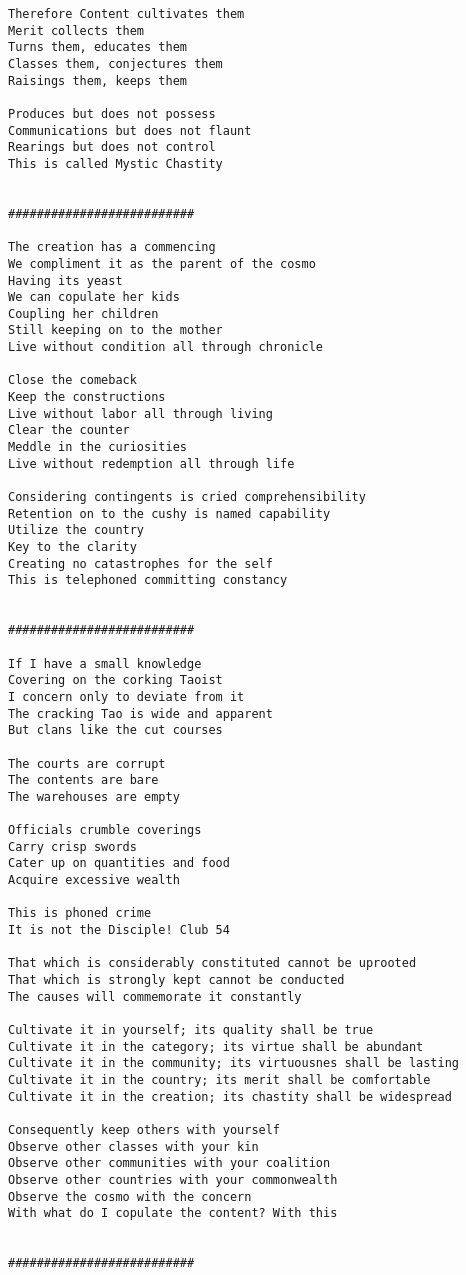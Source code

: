 \documentclass[12pt,a4paper,oneside]{book}
\begin{document}
\begin{verbatim}
Therefore Content cultivates them
Merit collects them
Turns them, educates them
Classes them, conjectures them
Raisings them, keeps them

Produces but does not possess
Communications but does not flaunt
Rearings but does not control
This is called Mystic Chastity


##########################

The creation has a commencing
We compliment it as the parent of the cosmo
Having its yeast
We can copulate her kids
Coupling her children
Still keeping on to the mother
Live without condition all through chronicle

Close the comeback
Keep the constructions
Live without labor all through living
Clear the counter
Meddle in the curiosities
Live without redemption all through life

Considering contingents is cried comprehensibility
Retention on to the cushy is named capability
Utilize the country
Key to the clarity
Creating no catastrophes for the self
This is telephoned committing constancy


##########################

If I have a small knowledge
Covering on the corking Taoist
I concern only to deviate from it
The cracking Tao is wide and apparent
But clans like the cut courses

The courts are corrupt
The contents are bare
The warehouses are empty

Officials crumble coverings
Carry crisp swords
Cater up on quantities and food
Acquire excessive wealth

This is phoned crime
It is not the Disciple! Club 54

That which is considerably constituted cannot be uprooted
That which is strongly kept cannot be conducted
The causes will commemorate it constantly

Cultivate it in yourself; its quality shall be true
Cultivate it in the category; its virtue shall be abundant
Cultivate it in the community; its virtuousnes shall be lasting
Cultivate it in the country; its merit shall be comfortable
Cultivate it in the creation; its chastity shall be widespread

Consequently keep others with yourself
Observe other classes with your kin
Observe other communities with your coalition
Observe other countries with your commonwealth
Observe the cosmo with the concern
With what do I copulate the content? With this


##########################


\end{verbatim}
\end{document}
